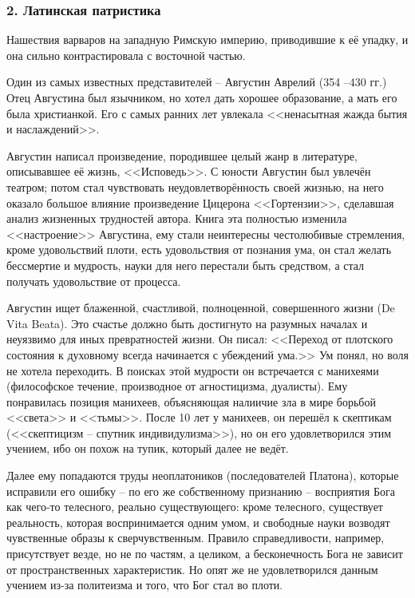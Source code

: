 \documentclass[a4paper, 12pt]{book} %
\begin{document}
\subsubsection*{2. Латинская патристика}
Нашествия варваров на западную Римскую империю, приводившие к её  упадку, и она сильно контрастировала с восточной частью.

Один из самых известных представителей -- Августин Аврелий (354 --430 гг.) Отец Августина был язычником, но хотел дать хорошее образование, а мать его была христианкой. Его с самых ранних лет увлекала <<ненасытная жажда бытия и наслаждений>>. 

Августин написал произведение, породившее целый жанр в литературе, описывавшее её жизнь, <<Исповедь>>. С юности Августин был увлечён театром; потом стал чувствовать неудовлетворённость своей жизнью, на него оказало большое влияние произведение Цицерона <<Гортензии>>, сделавшая анализ жизненных трудностей автора. Книга эта полностью изменила <<настроение>> Августина, ему стали неинтересны честолюбивые стремления, кроме удовольствий плоти, есть удовольствия от познания ума, он стал желать бессмертие и мудрость, науки для него перестали быть средством, а стал получать удовольствие от процесса.

Августин ищет блаженной, счастливой, полноценной, совершенного жизни (De Vita Beata). Это счастье должно быть достигнуто на разумных началах и неуязвимо для иных превратностей жизни. Он писал: <<Переход от плотского состояния к духовному всегда начинается с убеждений ума.>> Ум понял, но воля не хотела переходить. В поисках этой мудрости он встречается с манихеями (философское течение, производное от агностицизма, дуалисты). Ему понравилась позиция манихеев, объясняющая налиичие зла в мире борьбой <<света>> и <<тьмы>>. После 10 лет у манихеев, он перешёл к скептикам (<<скептицизм -- спутник индивидулизма>>), но он его удовлетворился этим учением, ибо он похож на тупик, который далее не ведёт.

 Далее ему попадаются труды неоплатоников (последователей Платона), которые исправили его ошибку -- по его же собственному признанию -- восприятия Бога как чего-то телесного, реально существующего: кроме телесного, существует реальность, которая воспринимается одним умом, и свободные науки возводят чувственные образы к сверчувственным. Правило справедливости, например, присутствует везде, но не по частям, а целиком, а бесконечность Бога не зависит от пространственных характеристик. Но опят же не удовлетворился данным учением из-за политеизма и того, что Бог стал во плоти.
 
\end{document}
